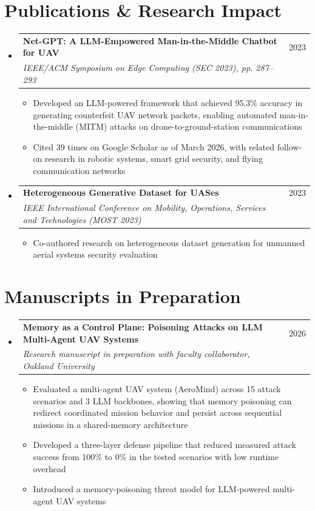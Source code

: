 \documentclass[letterpaper,11pt]{article}
\makeatletter
\newcommand{\resumeItem}[1]{
  \item\small{
    {#1 \vspace{-2pt}}
  }
}
\newcommand{\resumeSubheading}[4]{
  \vspace{-2pt}\item
    \begin{tabular*}{0.97\textwidth}[t]{l@{\extracolsep{\fill}}r}
      \textbf{#1} & #2 \\
      \textit{\small#3} & \textit{\small #4} \\
    \end{tabular*}\vspace{-7pt}
}
\newcommand{\resumeSubHeadingListStart}{\begin{itemize}[leftmargin=0.15in, label={}]}
\newcommand{\resumeSubHeadingListEnd}{\end{itemize}}
\newcommand{\resumeItemListStart}{\begin{itemize}}
\newcommand{\resumeItemListEnd}{\end{itemize}\vspace{-5pt}}
\makeatother
\begin{document}
\section{Publications \& Research Impact}
  \resumeSubHeadingListStart
    \resumeSubheading
      {Net-GPT: A LLM-Empowered Man-in-the-Middle Chatbot for UAV}{2023}
      {IEEE/ACM Symposium on Edge Computing (SEC 2023), pp. 287--293}{}
      \resumeItemListStart
        \resumeItem{Developed an LLM-powered framework that achieved 95.3\% accuracy in generating counterfeit UAV network packets, enabling automated man-in-the-middle (MITM) attacks on drone-to-ground-station communications}
        \resumeItem{Cited 39 times on Google Scholar as of March 2026, with related follow-on research in robotic systems, smart grid security, and flying communication networks}
      \resumeItemListEnd
    \resumeSubheading
      {Heterogeneous Generative Dataset for UASes}{2023}
      {IEEE International Conference on Mobility, Operations, Services and Technologies (MOST 2023)}{}
      \resumeItemListStart
        \resumeItem{Co-authored research on heterogeneous dataset generation for unmanned aerial systems security evaluation}
      \resumeItemListEnd
  \resumeSubHeadingListEnd

\section{Manuscripts in Preparation}
  \resumeSubHeadingListStart
    \resumeSubheading
      {Memory as a Control Plane: Poisoning Attacks on LLM Multi-Agent UAV Systems}{2026}
      {Research manuscript in preparation with faculty collaborator, Oakland University}{}
      \resumeItemListStart
        \resumeItem{Evaluated a multi-agent UAV system (AeroMind) across 15 attack scenarios and 3 LLM backbones, showing that memory poisoning can redirect coordinated mission behavior and persist across sequential missions in a shared-memory architecture}
        \resumeItem{Developed a three-layer defense pipeline that reduced measured attack success from 100\% to 0\% in the tested scenarios with low runtime overhead}
        \resumeItem{Introduced a memory-poisoning threat model for LLM-powered multi-agent UAV systems}
      \resumeItemListEnd
  \resumeSubHeadingListEnd

\end{document}
